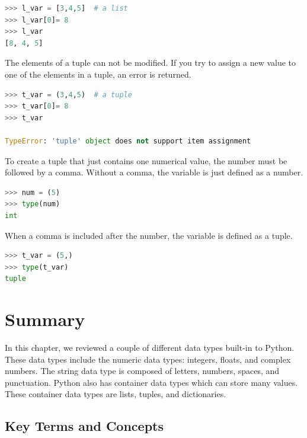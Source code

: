 \documentclass{book}
\begin{document}
\begin{lstlisting}[language=Python]
>>> l_var = [3,4,5]  # a list
>>> l_var[0]= 8
>>> l_var
[8, 4, 5]
\end{lstlisting}

The elements of a tuple can not be modified. If you try to assign a new
value to one of the elements in a tuple, an error is returned.

\begin{lstlisting}[language=Python]
>>> t_var = (3,4,5)  # a tuple
>>> t_var[0]= 8
>>> t_var

TypeError: 'tuple' object does not support item assignment
\end{lstlisting}

To create a tuple that just contains one numerical value, the number
must be followed by a comma. Without a comma, the variable is just
defined as a number.

\begin{lstlisting}[language=Python]
>>> num = (5)
>>> type(num)
int
\end{lstlisting}

When a comma is included after the number, the variable is defined as a
tuple.

\begin{lstlisting}[language=Python]
>>> t_var = (5,)
>>> type(t_var)
tuple
\end{lstlisting}
    




    
        \newpage
        \section{Summary}\label{summary}

    




    
        In this chapter, we reviewed a couple of different data types built-in
to Python. These data types include the numeric data types: integers,
floats, and complex numbers. The string data type is composed of
letters, numbers, spaces, and punctuation. Python also has container
data types which can store many values. These container data types are
lists, tuples, and dictionaries.
    




    
        \subsection{Key Terms and Concepts}\label{key-terms-and-concepts}
    
\end{document}
